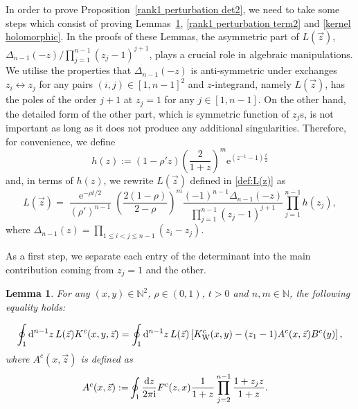 \documentclass[cmp]{svjour}
\numberwithin{theorem}{section}
\numberwithin{equation}{section}
\DeclareMathOperator{\e}{e}
\def\dd{{\rm d}}
\def\ii{{\rm i}}
\newtheorem{lemman}[theorem]{Lemma}
\begin{document}
In order to prove Proposition~\ref{rank1 perturbation det2}, we need to take some steps which consist of proving Lemmas~\ref{rank1 perturbation term1}, \ref{rank1 perturbation term2} and \ref{kernel holomorphic}.
In the proofs of these Lemmas, the asymmetric part of $L(\vec{z})$, $\Delta_{n-1}(-z)/\prod_{j=1}^{n-1}{(z_j - 1)}^{j+1}$, plays a crucial role in algebraic manipulations.
We utilise the properties that $\Delta_{n-1}(-z)$ is anti-symmetric under exchanges $z_i \leftrightarrow z_j$ for any pairs $(i , j) \in {[1,n-1]}^2$ and  $z$-integrand, namely $L(\vec{z})$, has the poles of the order $j+1$ at $z_j = 1$ for any $j \in [1,n-1]$.
On the other hand, the detailed form of the other part, which is symmetric function of $z_j$s, is not important as long as it does not produce any additional singularities. Therefore, for convenience, we define \begin{equation*}
\label{def:h}
h(z) := (1 - \rho' z) {\left( \frac{2}{1 + z} \right)}^m \mathrm{e}^{ (z^{-1} - 1) \frac{t}{2} }
\end{equation*}
and, in terms of $h(z)$, we rewrite $L(\vec{z})$ defined in \eqref{def:L(z)} as
\begin{equation}
\label{simple:L(z)}
	    L(\vec{z}) =  \frac{\e^{-\rho t/2}}{(\rho')^{n-1}  } \left(\frac{2(1-\rho)}{2-\rho}\right)^m  \frac{ {(-1)}^{n-1} \Delta_{n-1}(-z) }
		{\prod_{j=1}^{n-1} (z_j-1)^{j+1} } \prod_{j=1}^{n-1}{h(z_j)} ,
\end{equation}
where $\Delta_{n-1}(z) = \prod_{1 \leq i < j \leq n-1}{(z_i - z_j)}$.


As a first step, we separate each entry of the determinant into the main contribution coming from $z_j = 1$ and the other.


\medskip

\begin{lemman}
\label{rank1 perturbation term1}
For any $(x , y) \in \mathbb{N}^2$, $\rho \in (0,1)$, $t > 0$ and $n, m \in \mathbb{N}$, the following equality holds:

\begin{equation}\label{eq:rank1lem1}
\oint_{1} \dd^{n-1} z\, L(\vec{z}) K^c(x ,y , \vec{z}) = \oint_{1} \dd^{n-1} z\, L(\vec{z})  \left[ K_{\mathrm{W}}^c(x , y) -  (z_1 - 1) A^c(x, \vec{z}) B^c(y) \right],
\end{equation}
where $A^c(x , \vec{z})$ is defined as
\begin{align*}
A^c(x, \vec{z}) := & \oint_{1} \frac{ \dd z }{2 \pi \ii} F^c(z, x)  \frac{1}{ 1+z} \prod_{j=2}^{n-1}{ \frac{1 + z_j z}{1+z} }. 
\end{align*}
\end{lemman}
\end{document}

